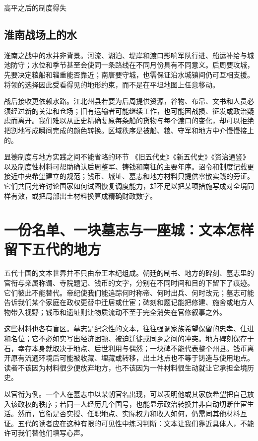 \begin{causalchain}{高平之后的制度得失}
\subsection{淮南战场上的水}

淮南之战中的水并非背景。河流、湖泊、堤岸和渡口影响军队行进、船运补给与城池防守；水位和季节甚至会使同一条路线在不同月份具有不同意义。后周要攻城，先要决定粮船和辎重能否靠近；南唐要守城，也需保证沿水城镇间仍可互相支援。将领的选择因此受看得见的地形约束，而不是在平坦地图上任意移动。

战后接收更依赖水路。江北州县若要为后周提供资源，谷物、布帛、文书和人员必须经过新的关津和仓场；旧有运输者可能继续工作，也可能因战损、征发或政治疑虑而离开。我们难以从正史精确复原每条船的货物与每个渡口的变化，却可以拒绝把割地写成瞬间完成的颜色转换。区域秩序是被船、粮、守军和地方中介慢慢接上的。

\begin{sourcenote}{显德制度与地方实践之间不能省略的环节}
《旧五代史》《新五代史》《资治通鉴》以及制度性材料可帮助确认后周整军、铸钱和南征的主要年序。诏令和制度记载更接近中央希望建立的规范；钱币、城址、墓志和地方材料只提供零散实践的旁证。它们共同允许讨论国家如何试图恢复调度能力，却不足以把某项措施写成对全境同样有效，或把局部出土材料换算成精确财政数字。
\end{sourcenote}

\section{一份名单、一块墓志与一座城：文本怎样留下五代的地方}

五代十国的文本世界并不只由帝王本纪组成。朝廷的制书、地方的碑刻、墓志里的官衔与亲属称谓、寺院题记、钱币的文字，分别在不同时间和目的下留下了痕迹。它们彼此不能替代。帝纪使我们能追踪何时称帝、何时出兵、何时改元；墓志可能告诉我们某个家庭在政权更替中迁居或仕宦；碑刻和题记能把修建、施舍或地方人物带入视野；钱币和遗址则让物质流动不至于完全消失在官修叙事之外。

这些材料也各有盲区。墓志是纪念性的文本，往往强调家族希望保留的忠孝、仕进和名位；它不必如实写出经济困顿、被迫迁徙或同乡之间的冲突。地方碑刻保存于石，幸存本身就取决于地点、后世利用与偶然；一块碑不能代表整个州县。钱币离开原有流通环境后可能被收藏、埋藏或转移，出土地点也不等于铸造与使用地点。读者不该因为材料很少便放弃地方，也不该因为一件材料很生动就让它承担全境历史。

以官衔为例。一个人在墓志中以某朝官名出现，可以表明他或其家族希望把自己放入该政权的秩序；若同一人经历几个国号，也能显示政治转换并非自动切断仕宦生活。然而，官衔是否实授、任职地点、实际权力和收入如何，仍需同其他材料互证。五代的读者应在这种有限的可见性中练习判断：文本让我们靠近具体人，不能许可我们替他们填写心声。


\end{causalchain}

